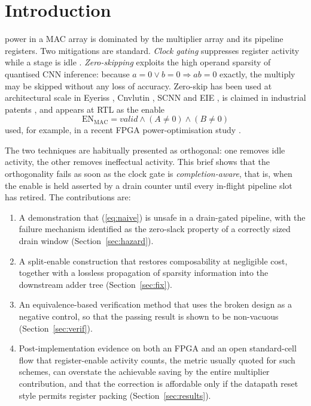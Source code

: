 \documentclass[journal,twocolumn]{IEEEtran}
\begin{document}
\section{Introduction}
 power in a MAC array is dominated by the multiplier
array and its pipeline registers. Two mitigations are standard. \emph{Clock
gating} suppresses register activity while a stage is idle
\cite{benini,wupedram}. \emph{Zero-skipping} exploits the high operand
sparsity of quantised CNN inference: because $a=0 \vee b=0 \Rightarrow ab=0$
exactly, the multiply may be skipped without any loss of accuracy. Zero-skip
has been used at architectural scale in Eyeriss \cite{eyeriss}, Cnvlutin
\cite{cnvlutin}, SCNN \cite{scnn} and EIE \cite{eie}, is claimed in industrial
patents \cite{pat_google,pat_img}, and appears at RTL as the enable
\begin{equation}
\mathrm{EN}_{\mathrm{MAC}}=\mathit{valid}\wedge(A\neq0)\wedge(B\neq0)
\label{eq:naive}
\end{equation}
used, for example, in a recent FPGA power-optimisation study \cite{gohel}.

The two techniques are habitually presented as orthogonal: one removes idle
activity, the other removes ineffectual activity. This brief shows that the
orthogonality fails as soon as the clock gate is \emph{completion-aware}, that
is, when the enable is held asserted by a drain counter until every in-flight
pipeline slot has retired. The contributions are:

\begin{enumerate}
\item A demonstration that (\ref{eq:naive}) is unsafe in a drain-gated
pipeline, with the failure mechanism identified as the zero-slack property of
a correctly sized drain window (Section~\ref{sec:hazard}).
\item A split-enable construction that restores composability at negligible
cost, together with a lossless propagation of sparsity information into the
downstream adder tree (Section~\ref{sec:fix}).
\item An equivalence-based verification method that uses the broken design as
a negative control, so that the passing result is shown to be non-vacuous
(Section~\ref{sec:verif}).
\item Post-implementation evidence on both an FPGA and an open
standard-cell flow that register-enable activity counts, the metric usually
quoted for such schemes, can overstate the achievable saving by the entire
multiplier contribution, and that the correction is affordable only if the
datapath reset style permits register packing
(Section~\ref{sec:results}).
\end{enumerate}
\end{document}
